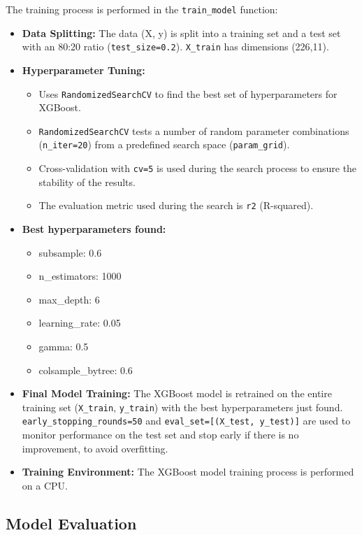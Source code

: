 \documentclass[12pt, a4paper]{report}
\begin{document}
The training process is performed in the \texttt{train\_model} function:
\begin{itemize}
    \item \textbf{Data Splitting:} The data (X, y) is split into a training set and a test set with an 80:20 ratio (\texttt{test\_size=0.2}). \texttt{X\_train} has dimensions (226,11).
    \item \textbf{Hyperparameter Tuning:}
    \begin{itemize}
        \item Uses \texttt{RandomizedSearchCV} to find the best set of hyperparameters for XGBoost.
        \item \texttt{RandomizedSearchCV} tests a number of random parameter combinations (\texttt{n\_iter=20}) from a predefined search space (\texttt{param\_grid}).
        \item Cross-validation with \texttt{cv=5} is used during the search process to ensure the stability of the results.
        \item The evaluation metric used during the search is \texttt{r2} (R-squared).
    \end{itemize}
    \item \textbf{Best hyperparameters found:}
    \begin{itemize}
        \item subsample: 0.6
        \item n\_estimators: 1000
        \item max\_depth: 6
        \item learning\_rate: 0.05
        \item gamma: 0.5
        \item colsample\_bytree: 0.6
    \end{itemize}
    \item \textbf{Final Model Training:} The XGBoost model is retrained on the entire training set (\texttt{X\_train}, \texttt{y\_train}) with the best hyperparameters just found. \texttt{early\_stopping\_rounds=50} and \texttt{eval\_set=[(X\_test, y\_test)]} are used to monitor performance on the test set and stop early if there is no improvement, to avoid overfitting.
    \item \textbf{Training Environment:} The XGBoost model training process is performed on a CPU.
\end{itemize}

\subsection{Model Evaluation}
\end{document}
